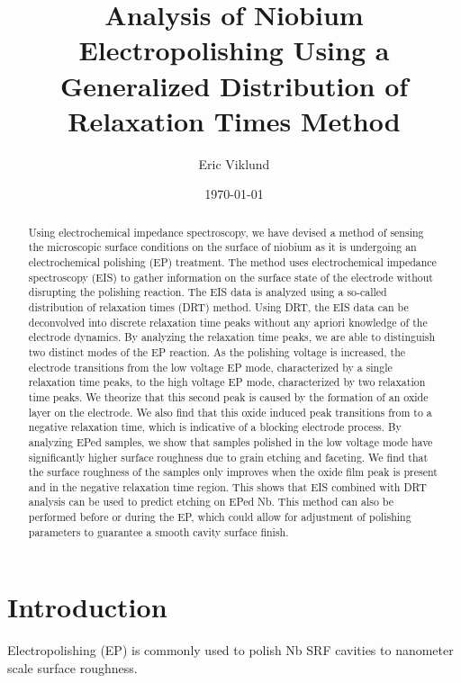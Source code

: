 \documentclass{revtex4-2}
\begin{document}
\title{Analysis of Niobium Electropolishing Using a Generalized Distribution of Relaxation Times Method}
\author{Eric Viklund}
\date{\today}

\begin{abstract}
  Using electrochemical impedance spectroscopy, we have devised a method of sensing the microscopic surface conditions on the surface of niobium as it is undergoing an electrochemical polishing (EP) treatment. The method uses electrochemical impedance spectroscopy (EIS) to gather information on the surface state of the electrode without disrupting the polishing reaction. The EIS data is analyzed using a so-called distribution of relaxation times (DRT) method. Using DRT, the EIS data can be deconvolved into discrete relaxation time peaks without any apriori knowledge of the electrode dynamics. By analyzing the relaxation time peaks, we are able to distinguish two distinct modes of the EP reaction. As the polishing voltage is increased, the electrode transitions from the low voltage EP mode, characterized by a single relaxation time peaks, to the high voltage EP mode, characterized by two relaxation time peaks. We theorize that this second peak is caused by the formation of an oxide layer on the electrode. We also find that this oxide induced peak transitions from to a negative relaxation time, which is indicative of a blocking electrode process. By analyzing EPed samples, we show that samples polished in the low voltage mode have significantly higher surface roughness due to grain etching and faceting. We find that the surface roughness of the samples only improves when the oxide film peak is present and in the negative relaxation time region. This shows that EIS combined with DRT analysis can be used to predict etching on EPed Nb. This method can also be performed before or during the EP, which could allow for adjustment of polishing parameters to guarantee a smooth cavity surface finish.
\end{abstract}

\maketitle



\section{Introduction}
\label{sec:org5ef967f}
Electropolishing (EP) is commonly used to polish Nb SRF cavities to nanometer scale surface roughness. 
\end{document}

